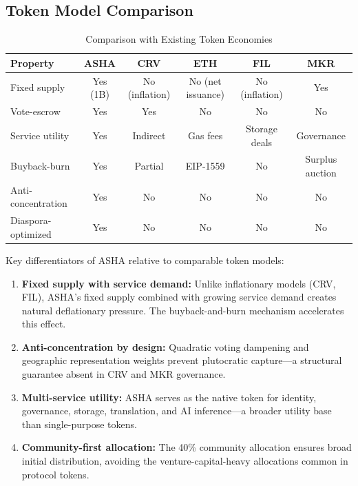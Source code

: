 \documentclass[11pt,a4paper]{article}
\begin{document}
\subsection{Token Model Comparison}

\begin{table}[H]
\centering
\caption{Comparison with Existing Token Economies}
\label{tab:comparison}
\begin{tabular}{lccccc}
\toprule
\textbf{Property} & \textbf{ASHA} & \textbf{CRV} & \textbf{ETH} & \textbf{FIL} & \textbf{MKR} \\
\midrule
Fixed supply & Yes (1B) & No (inflation) & No (net issuance) & No (inflation) & Yes \\
Vote-escrow & Yes & Yes & No & No & No \\
Service utility & Yes & Indirect & Gas fees & Storage deals & Governance \\
Buyback-burn & Yes & Partial & EIP-1559 & No & Surplus auction \\
Anti-concentration & Yes & No & No & No & No \\
Diaspora-optimized & Yes & No & No & No & No \\
\bottomrule
\end{tabular}
\end{table}

Key differentiators of ASHA relative to comparable token models:

\begin{enumerate}
    \item \textbf{Fixed supply with service demand:} Unlike inflationary models (CRV, FIL), ASHA's fixed supply combined with growing service demand creates natural deflationary pressure. The buyback-and-burn mechanism accelerates this effect.
    \item \textbf{Anti-concentration by design:} Quadratic voting dampening and geographic representation weights prevent plutocratic capture---a structural guarantee absent in CRV and MKR governance.
    \item \textbf{Multi-service utility:} ASHA serves as the native token for identity, governance, storage, translation, and AI inference---a broader utility base than single-purpose tokens.
    \item \textbf{Community-first allocation:} The 40\% community allocation ensures broad initial distribution, avoiding the venture-capital-heavy allocations common in protocol tokens.
\end{enumerate}
\end{document}
